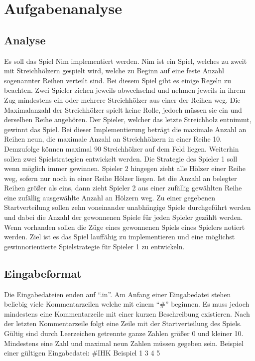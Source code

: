 \chapter{Aufgabenanalyse}
\label{chap:Aufgabenanalyse}

\section{Analyse}
Es soll das Spiel Nim implementiert werden. Nim ist ein Spiel, welches zu zweit mit
Streichhölzern gespielt wird, welche zu Beginn auf eine feste Anzahl sogenannter Reihen
verteilt sind. Bei diesem Spiel gibt es einige Regeln zu beachten. Zwei Spieler ziehen jeweils
abwechselnd und nehmen jeweils in ihrem Zug mindestens ein oder mehrere Streichhölzer
aus einer der Reihen weg. Die Maximalanzahl der Streichhölzer spielt keine Rolle, jedoch
müssen sie ein und derselben Reihe angehören. Der Spieler, welcher das letzte Streichholz
entnimmt, gewinnt das Spiel.
Bei dieser Implementierung beträgt die maximale Anzahl an Reihen neun, die maximale
Anzahl an Streichhölzern in einer Reihe 10. Demzufolge können maximal 90 Streichhölzer auf
dem Feld liegen. Weiterhin sollen zwei Spielstrategien entwickelt werden. Die Strategie des
Spieler 1 soll wenn möglich immer gewinnen. Spieler 2 hingegen zieht alle Hölzer einer Reihe
weg, sofern nur noch in einer Reihe Hölzer liegen. Ist die Anzahl an belegter Reihen größer
als eins, dann zieht Spieler 2 aus einer zufällig gewählten Reihe eine zufällig ausgewählte
Anzahl an Hölzern weg.
Zu einer gegebenen Startverteilung sollen zehn voneinander unabhängige Spiele
durchgeführt werden und dabei die Anzahl der gewonnenen Spiele für jeden Spieler gezählt
werden. Wenn vorhanden sollen die Züge eines gewonnenen Spiels eines Spielers notiert
werden.
Ziel ist es das Spiel lauffähig zu implementieren und eine möglichst gewinnorientierte
Spielstrategie für Spieler 1 zu entwickeln.

\section{Eingabeformat}
Die Eingabedateien enden auf “.in”. Am Anfang einer Eingabedatei stehen beliebig viele
Kommentarzeilen welche mit einem “\#” beginnen. Es muss jedoch mindestens eine
Kommentarzeile mit einer kurzen Beschreibung existieren. Nach der letzten Kommentarzeile
folgt eine Zeile mit der Startverteilung des Spiels. Gültig sind durch Leerzeichen getrennte
ganze Zahlen größer 0 und kleiner 10. Mindestens eine Zahl und maximal neun Zahlen
müssen gegeben sein.
Beispiel einer gültigen Eingabedatei:
\#IHK Beispiel 1 
3 4 5

